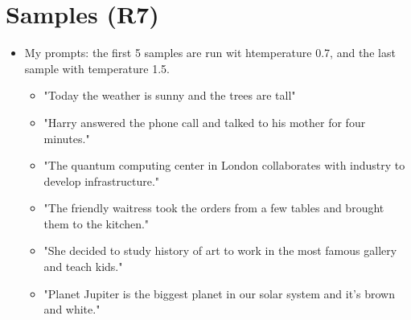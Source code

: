 \documentclass[11pt,a4paper]{article}
\begin{document}
\section{Samples (R7)}
\begin{itemize} 
\item My prompts: the first 5 samples are run wit htemperature 0.7, and the last sample with temperature 1.5.
\begin{itemize} 
\item "Today the weather is sunny and the trees are tall"
\item "Harry answered the phone call and talked to his mother for four minutes."
\item "The quantum computing center in London collaborates with industry to develop infrastructure."
\item "The friendly waitress took the orders from a few tables and brought them to the kitchen."
\item "She decided to study history of art to work in the most famous gallery and teach kids."
\item "Planet Jupiter is the biggest planet in our solar system and it's brown and white."
\end{itemize}


\end{itemize}
\end{document}

